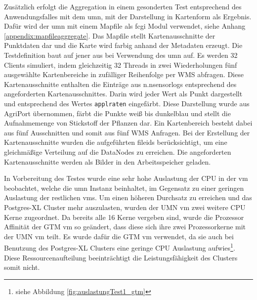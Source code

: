Zusätzlich erfolgt die Aggregation in einem gesonderten Test entsprechend des Anwendungsfalles mit dem \Gls{umn}, mit der Darstellung in Kartenform als Ergebnis.
Dafür wird der \Gls{umn} mit einem Mapfile als \Gls{fcgi} Modul verwendet, siehe Anhang \ref{appendix:mapfileaggregate}.
Das Mapfile stellt Kartenausschnitte der Punktdaten dar und die Karte wird farbig anhand der Metadaten erzeugt.
Die Testdefinition baut auf jener aus \cite{ba:kurt} bei Verwendung des \Gls{umn} auf.
Es werden 32 Clients simuliert, indem gleichzeitig 32 Threads in zwei Wiederholungen fünf ausgewählte Kartenbereiche in zufälliger Reihenfolge per WMS abfragen.
Diese Kartenausschnitte enthalten die Einträge aus n.nsensorlogs entsprechend des angeforderten Kartenausschnittes.
Darin wird jeder Wert als Punkt dargestellt und entsprechend des Wertes \verb+applraten+ eingefärbt.
Diese Darstellung wurde aus AgriPort übernommen, färbt die Punkte weiß bis dunkelblau und stellt die Aufnahmemenge von Stickstoff der Pflanzen dar.
Ein Kartenbereich besteht dabei aus fünf Ausschnitten und somit aus fünf WMS Anfragen.
Bei der Erstellung der Kartenausschnitte wurden die aufgeführten fileids berücksichtigt, um eine gleichmäßige Verteilung auf die DataNodes zu erreichen.
Die angeforderten Kartenausschnitte werden als Bilder in den Arbeitsspeicher geladen.

In Vorbereitung des Testes wurde eine sehr hohe Auslastung der CPU in der \Gls{vm} beobachtet, welche die \Gls{umn} Instanz beinhaltet, im Gegensatz zu einer geringen Auslastung der restlichen \Gls{vm}s.
Um einen höheren Durchsatz zu erreichen und das Postgres-XL Cluster mehr auszulasten, wurden der UMN \Gls{vm} zwei weitere CPU Kerne zugeordnet.
Da bereits alle 16 Kerne vergeben sind, wurde die Prozessor Affinität der GTM \Gls{vm} so geändert, dass diese sich ihre zwei Prozessorkerne mit der UMN \Gls{vm} teilt.
Es wurde dafür die GTM \Gls{vm} verwendet, da sie auch bei Benutzung des Postgres-XL Clusters eine geringe CPU Auslastung aufwies\footnote{siehe Abbildung \ref{fig:auslastungTest1_gtm}}.
Diese Ressourcenaufteilung beeinträchtigt die Leistungsfähigkeit des Clusters somit nicht.

